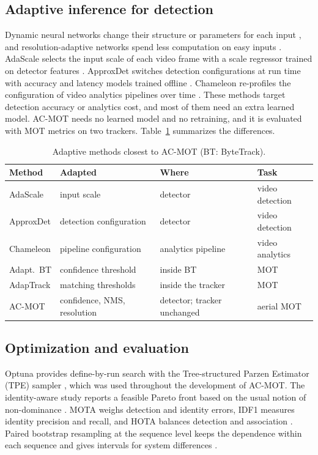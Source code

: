 \subsection{Adaptive inference for detection}
Dynamic neural networks change their structure or parameters for each input
\cite{han2022dynamic}, and resolution-adaptive networks spend less computation
on easy inputs \cite{yang2020ranet}. AdaScale selects the input scale of each
video frame with a scale regressor trained on detector features
\cite{chin2019adascale}. ApproxDet switches detection configurations at run
time with accuracy and latency models trained offline \cite{xu2020approxdet}.
Chameleon re-profiles the configuration of video analytics pipelines over time
\cite{jiang2018chameleon}. These methods target detection accuracy or
analytics cost, and most of them need an extra learned model. AC-MOT needs no
learned model and no retraining, and it is evaluated with MOT metrics on two
trackers. Table~\ref{tab:related} summarizes the differences.

\begin{table}[t]
\caption{Adaptive methods closest to AC-MOT (BT: ByteTrack).}
\label{tab:related}
\centering\footnotesize
\setlength{\tabcolsep}{3pt}
\begin{tabular}{@{}l>{\raggedright\arraybackslash}p{20mm}>{\raggedright\arraybackslash}p{17mm}>{\raggedright\arraybackslash}p{13mm}@{}}
\toprule
Method & Adapted & Where & Task\\
\midrule
AdaScale \cite{chin2019adascale} & input scale & detector & video detection\\
ApproxDet \cite{xu2020approxdet} & detection configuration & detector & video detection\\
Chameleon \cite{jiang2018chameleon} & pipeline configuration & analytics pipeline & video analytics\\
Adapt.\ BT \cite{ma2023adaptivebytetrack} & confidence threshold & inside BT & MOT\\
AdapTrack \cite{shim2024adaptrack} & matching thresholds & inside the tracker & MOT\\
AC-MOT & confidence, NMS, resolution & detector; tracker unchanged & aerial MOT\\
\bottomrule
\end{tabular}
\end{table}

\subsection{Optimization and evaluation}
Optuna provides define-by-run search with the Tree-structured Parzen Estimator
(TPE) sampler \cite{akiba2019optuna}, which was used throughout the
development of AC-MOT. The identity-aware study reports a feasible Pareto
front based on the usual notion of non-dominance \cite{deb2002nsga2}. MOTA
weighs detection and identity errors, IDF1 measures identity precision and
recall, and HOTA balances detection and association \cite{luiten2021hota}.
Paired bootstrap resampling at the sequence level keeps the dependence within
each sequence and gives intervals for system differences
\cite{efron1993bootstrap}.
